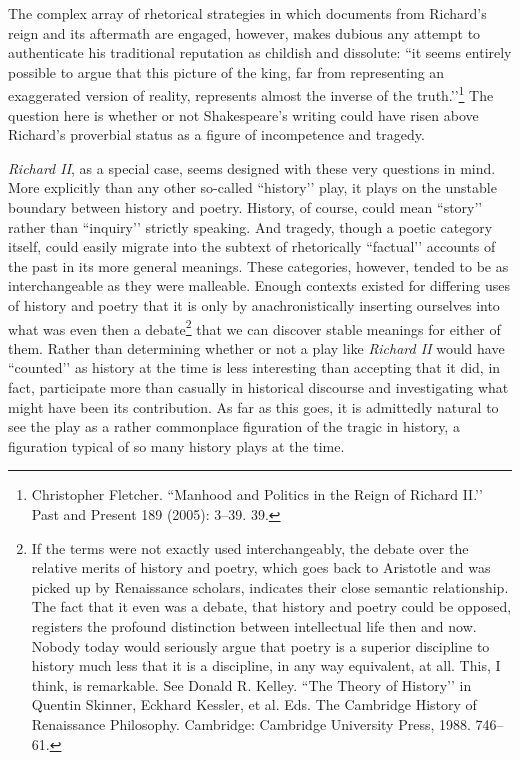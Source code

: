 The complex array of rhetorical strategies in which documents from Richard’s reign and its aftermath are engaged, however, makes dubious any attempt to authenticate his traditional reputation as childish and dissolute: ``it seems entirely possible to argue that this picture of the king, far from representing an exaggerated version of reality, represents almost the inverse of the truth.’’\footnote{Christopher Fletcher. ``Manhood and Politics in the Reign of Richard II.’’ Past and Present 189 (2005): 3--39. 39.} The question here is whether or not Shakespeare’s writing could have risen above Richard’s proverbial status as a figure of incompetence and tragedy.

\emph{Richard II}, as a special case, seems designed with these very questions in mind.
More explicitly than any other so-called ``history’’ play, it plays on the unstable boundary between history and poetry.
History, of course, could mean ``story’’ rather than ``inquiry’’ strictly speaking.
And tragedy, though a poetic category itself, could easily migrate into the subtext of rhetorically ``factual’’ accounts of the past in its more general meanings.
These categories, however, tended to be as interchangeable as they were malleable.
Enough contexts existed for differing uses of history and poetry that it is only by anachronistically inserting ourselves into what was even then a debate\footnote{If the terms were not exactly used interchangeably, the debate over the relative merits of history and poetry, which goes back to Aristotle and was picked up by Renaissance scholars, indicates their close semantic relationship.
The fact that it even was a debate, that history and poetry could be opposed, registers the profound distinction between intellectual life then and now.
Nobody today would seriously argue that poetry is a superior discipline to history much less that it is a discipline, in any way equivalent, at all. This, I think, is remarkable.
See Donald R. Kelley. ``The Theory of History’’ in Quentin Skinner, Eckhard Kessler, et al. Eds. The Cambridge History of Renaissance Philosophy. Cambridge: Cambridge University Press, 1988. 746--61.} that we can discover stable meanings for either of them.
Rather than determining whether or not a play like \emph{Richard II} would have ``counted’’ as history at the time is less interesting than accepting that it did, in fact, participate more than casually in historical discourse and investigating what might have been its contribution.
As far as this goes, it is admittedly natural to see the play as a rather commonplace figuration of the tragic in history, a figuration typical of so many history plays at the time.

